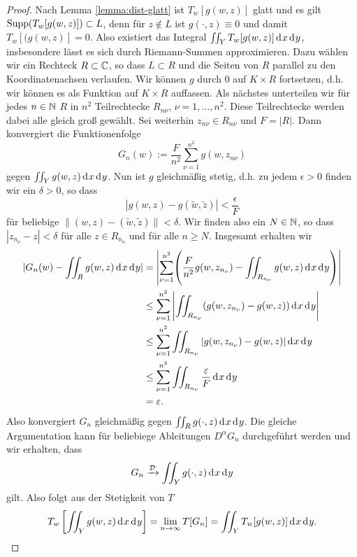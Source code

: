 \begin{proof}
  Nach Lemma \ref{lemma:dist-glatt} ist $T_w[g(w,z)]$ glatt und es
  gilt $\operatorname{Supp}(T_w[g(w,z)]) \subset L$, denn für $z \notin L$ ist
  $g(\cdot, z) \equiv 0$ und damit $T_w[(g(w,z)] = 0$. 
  Also existiert das Integral $\iint_Y T_w[g(w,z)] \d[x]\d[y]$,
  insbesondere lässt es sich durch Riemann-Summen approximieren. 
  Dazu wählen wir ein Rechteck $R \subset \mathbb{C}$, so dass $L \subset R$
  und die Seiten von $R$ parallel zu den Koordinatenachsen
  verlaufen. 
  Wir können $g$ durch 0 auf $K \times R$ fortsetzen, d.h. wir können
  es als Funktion auf $K \times R$ auffassen. 
  Als nächstes unterteilen wir für jedes $n \in \mathbb{N}$ $R$ in $n^2$
  Teilrechtecke $R_{n\nu}$, $\nu = 1, \dots, n^2$. Diese Teilrechtecke
  werden dabei alle gleich groß gewählt. Sei weiterhin $z_{n\nu}
  \in R_{n \nu}$ und $F = |R|$. 
  Dann konvergiert die Funktionenfolge
  \[
  G_n(w) := \frac{F}{n^2} \sum_{\nu=1}^{n^2} g(w, z_{n\nu})
  \]
  gegen $\iint_Y g(w,z) \d[x]\d[y]$. Nun ist $g$ gleichmäßig stetig,
  d.h. zu jedem $\epsilon > 0$ finden wir ein $\delta >0$, so dass
  \[
  | g(w,z) - g(\tilde w, \tilde z) | < \frac{\epsilon}{F}
  \]
  für beliebige $\| (w,z) - (\tilde w, \tilde z) \| < \delta$. Wir
  finden also ein $N \in \mathbb{N}$, so dass $|z_{n_\nu} - z| < \delta$ für
  alle $z \in R_{n_\nu}$ und für alle $n \geq N$. Insgesamt erhalten
  wir
  \begin{align*}
    |G_n(w) - \iint_R g(w,z) \d[x]\d[y]| & = \left | \sum_{\nu = 1}^{n^2}
    \middle ( \frac{F}{n^2} g(w, z_{n_\nu}) - \iint_{R_{n_\nu}} g(w,z)
      \d[x]\d[y] \middle ) \right | \\
    & \leq \sum_{\nu=1}^{n^2} \left | \iint_{R_{n_\nu}}
      (g(w,z_{n_\nu}) - g(w,z)) \d[x]\d[y] \right | \\
    & \leq \sum_{\nu=1}^{n^2} \iint_{R_{n_\nu}} |g(w, z_{n_\nu}) -
    g(w,z)| \d[x]\d[y] \\
    & \leq \sum_{\nu=1}^{n^2} \iint_{R_{n_\nu}} \frac{\epsilon}{F}
    \d[x] \d[y] \\
    & = \epsilon.
  \end{align*}
  Also konvergiert $G_n$ gleichmäßig gegen $\iint_R g(\cdot, z)
  \d[x]\d[y]$. Die gleiche Argumentation kann für beliebiege
  Ableitungen $D^\alpha G_n$ durchgeführt werden und wir erhalten,
  dass
  \[
  G_n \xrightarrow{\dist} \iint_Y g(\cdot, z) \d[x]\d[y]
  \]
  gilt. Also folgt aus der Stetigkeit von $T$
  \[
  T_w \left [ \iint_Y g(w, z) \d[x]\d[y] \right ] = \lim_{n \ra
    \infty} T[G_n] = \iint_Y T_w[g(w,z)] \d[x]\d[y].
  \]
\end{proof}

